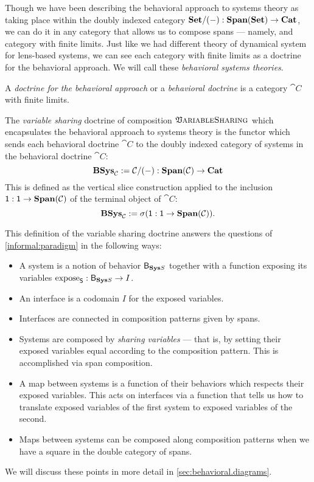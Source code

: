 \documentclass[DynamicalBook]{subfiles}
\begin{document}
Though we have been describing the behavioral approach to systems theory as
taking place within the doubly indexed category $\textbf{Set}/(-) :
\textbf{Span}(\textbf{Set}) \to \textbf{Cat}$, we can do it in any category that allows
us to compose spans --- namely, and category with finite limits. Just like we
had different theory of dynamical system for lens-based systems, we can see each
category with finite limits as a doctrine for the behavioral approach. We will
call these \emph{behavioral systems theories}.

\begin{definition}
A \emph{doctrine for the behavioral approach} or a \emph{behavioral doctrine} is a
category $\cat{C}$ with finite limits.

The \emph{variable sharing} doctrine of composition $\mathfrak{V}\textsc{ariableSharing}$ which encapsulates the behavioral approach to systems theory is the functor which sends each behavioral doctrine $\cat{C}$ to the doubly indexed category of systems in
the behavioral doctrine $\cat{C}$:
$$\textbf{BSys}_{\mathcal{C}} := \mathcal{C}/(-) : \textbf{Span}(\mathcal{C}) \to \textbf{Cat}$$
This is defined as the vertical slice construction applied to the inclusion $\mathsf{1} :
\mathsf{1} \to \textbf{Span}(\mathcal{C})$ of the terminal object of $\cat{C}$:
\[
\textbf{BSys}_{\mathcal{C}} := \sigma(\mathsf{1} : \mathsf{1} \to \textbf{Span}(\mathcal{C})).
\]
\end{definition}

This definition of the variable sharing doctrine answers the questions of \cref{informal:paradigm} in the following ways:
\begin{itemize}
        \item A system is a notion of behavior $\mathsf{B}_{\textbf{Sys}{S}}$ together with a function exposing its variables $\mathrm{expose}_{\mathsf{S}} : \mathsf{B}_{{\textbf{Sys}{S}}} \to I$.
      \item An interface is a codomain $I$ for the exposed variables.
      \item Interfaces are connected in composition patterns given by spans.
        \item Systems are composed by \emph{sharing variables} --- that is, by setting their exposed variables equal according to the composition pattern. This is accomplished via span composition.
  \item A map between systems is a function of their behaviors which respects their exposed variables. This acts on interfaces via a function that tells us how to translate exposed variables of the first system to exposed variables of the second.
        \item Maps between systems can be composed along composition patterns when we have a square in the double category of spans.
\end{itemize}
We will discuss these points in more detail in \cref{sec:behavioral.diagrams}.
\end{document}
